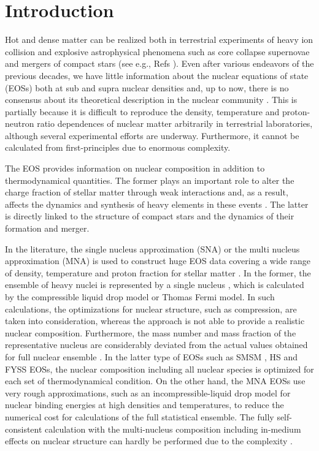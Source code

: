 \documentclass[preprint]{revtex4}
\begin{document}
\section{Introduction \label{intro}}
Hot and dense matter can be realized  both in terrestrial experiments of heavy ion collision and explosive astrophysical phenomena such as core collapse supernovae and mergers of compact stars  (see e.g., Refs  \cite{botvina04,janka12,kotake12,burrows13,foglizzo15,shibata11,faber12}). 
Even after various endeavors of the previous decades, we have little information about  the  nuclear equations of state (EOSs)  both at sub and supra nuclear densities
 and, up to now, there is no consensus about its theoretical description
in the nuclear community \cite{oertel17}.
This is partially because %
it is difficult  to  reproduce
the density, temperature and proton-neutron ratio dependences of  nuclear matter arbitrarily in terrestrial laboratories, although several experimental efforts are underway. 
Furthermore, it cannot be calculated from first-principles due to enormous  complexity.

The EOS provides information on  nuclear composition 
 in addition to thermodynamical quantities.
The former plays an important role to alter the charge fraction of stellar matter  
 through weak interactions \cite{raduta16, raduta17, furusawa17b}
and, as a result,  affects the dynamics and  synthesis of heavy elements
in  these events  \cite{hix03,lentz12,wanajo14, sekiguchi15}.
The latter is directly linked to the structure of compact stars and the dynamics of 
their formation and merger.

In the literature, 
the single nucleus approximation (SNA)  or the multi nucleus approximation (MNA) 
is used to construct huge EOS data covering a wide range of density, temperature and proton fraction for stellar matter \cite{buyukcizmeci13,sheng11}.
In the  former,  the ensemble of heavy nuclei is represented by a single nucleus
\cite{lattimer91, shen98a,shen98b,shen11,togashi17},
which is calculated by the compressible liquid drop model  or Thomas Fermi model. 
In such calculations, 
 the optimizations for nuclear structure, such as compression, are taken into consideration, whereas the approach is not able to  provide a realistic nuclear composition.
Furthermore,  the mass number and mass fraction of the representative nucleus 
are considerably deviated from the actual values obtained for full nuclear ensemble  \cite{furusawa17c}. 
{%
In the latter type of  EOSs such as  SMSM \cite{botvina04, botvina10,buyukcizmeci14}, HS  \cite{hempel10, steiner13} and FYSS \cite{furusawa11,furusawa13a, furusawa17a,furusawa17d} EOSs,  the nuclear composition including all nuclear species is optimized for each set of thermodynamical condition.}
On the other hand, the MNA EOSs 
use very rough approximations, such as an incompressible-liquid drop model 
for nuclear binding energies  at high densities and temperatures,  to reduce the numerical cost for calculations of the full statistical ensemble. 
The fully self-consistent calculation with the multi-nucleus composition 
including in-medium effects on nuclear structure can hardly be performed due to the complexity \cite{gulminelli15,furusawa17c}. 
\end{document}
